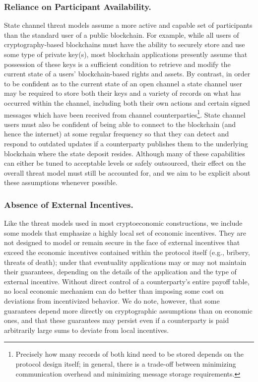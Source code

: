 \documentclass[prb,floatfix,reprint,nofootinbib,amsmath,amssymb,epsfig,pre,floats,letterpaper,groupedaffiliation,tightenlines,allcolors=blue,11pt]{revtex4}
\theoremstyle{definition}
\theoremstyle{definition}
\theoremstyle{definition}
\begin{document}
\subsubsection{Reliance on Participant Availability.} State channel threat models assume a more active and capable set of participants than the standard user of a public blockchain. For example, while all users of cryptography-based blockchains must have the ability to securely store and use some type of private key(s), most blockchain applications presently assume that possession of these keys is a sufficient condition to retrieve and modify the current state of a users' blockchain-based rights and assets. By contrast, in order to be confident as to the current state of an open channel a state channel user may be required to store both their keys and a variety of records on what has occurred within the channel, including both their own actions and certain signed messages which have been received from channel counterparties\footnote{Precisely how many records of both kind need to be stored depends on the protocol design itself; in general, there is a trade-off between minimizing communication overhead and minimizing message storage requirements.}. State channel users must also be confident of being able to connect to the blockchain (and hence the internet) at some regular frequency so that they can detect and respond to outdated updates if a counterparty publishes them to the underlying blockchain where the state deposit resides. Although many of these capabilities can either be tuned to acceptable levels or safely outsourced, their effect on the overall threat model must still be accounted for, and we aim to be explicit about these assumptions whenever possible.

\subsubsection{Absence of External Incentives.} Like the threat models used in most cryptoeconomic constructions, we include some models that emphasize a highly local set of economic incentives. They are not designed to model or remain secure in the face of external incentives that exceed the economic incentives contained within the protocol itself (e.g., bribery, threats of death); under that eventuality applications may or may not maintain their guarantees, depending on the details of the application and the type of external incentive.  Without direct control of a counterparty's entire payoff table, no local economic mechanism can do better than imposing some cost on deviations from incentivized behavior.  We do note, however, that some guarantees depend more directly on cryptographic assumptions than on economic ones, and that these guarantees may persist even if a counterparty is paid arbitrarily large sums to deviate from local incentives.
\end{document}
